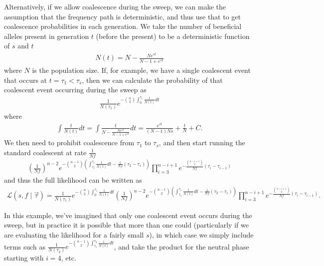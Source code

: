 \documentclass[reqno]{amsart}
\begin{document}
Alternatively, if we allow coalescence during the sweep, we can make the assumption that the frequency path is deterministic, and thus use that to get coalescence probabilities in each generation. We take the number of beneficial alleles present in generation $t$ (before the present) to be a deterministic function of $s$ and $t$
\begin{align}
	N(t) = N - \frac{N e^{st}}{N-1+e^{st}} 
\end{align}
where $N$ is the population size. If, for example, we have a single coalescent event that occurs at $t=\tau_1<\tau_s$, then we can calculate the probability of that coalescent event occurring during the sweep as 
\begin{align}
	\frac{1}{N(\tau_1)}e^{-\binom{n}{2}\int_0^{\tau_1}\frac{t}{N(t)}dt}
\end{align}
where
\begin{align}
	\int\frac{t}{N(t)}dt = \int\frac{t}{N - \frac{Ne^{st}}{N - 1 + e^{st}}}dt = \frac{e^{st}}{\left(N-1\right)Ns} + \frac{t}{N} + C.
\end{align}
We then need to prohibit coalescence from $\tau_1$ to $\tau_s$, and then start running the standard coalescent at rate $\frac{1}{Nf}$
\begin{align}
	\left(\frac{1}{Nf}\right)^{n-2}e^{-\binom{n-1}{2}\left(\int_{\tau_1}^{\tau_s}\frac{1}{N(t)}dt-\frac{1}{Nf}\left(\tau_2-\tau_{s}\right)\right)}\prod_{i=3}^{n-i+1}e^{-\frac{\binom{n-i+1}{2}}{Nf}\left(\tau_i-\tau_{i-1}\right)}
\end{align}
and thus the full likelihood can be written as
\begin{align}
	\mathcal{L}(s,f\mid \vec{\tau})=\frac{1}{N(\tau_1)}e^{-\binom{n}{2}\int_0^{\tau_1}\frac{1}{N(t)}dt}\left(\frac{1}{Nf}\right)^{n-2}e^{-\binom{n-1}{2}\left(\int_{\tau_1}^{\tau_s}\frac{1}{N(t)}dt-\frac{1}{Nf}\left(\tau_2-\tau_{s}\right)\right)}\prod_{i=3}^{n-i+1}e^{-\frac{\binom{n-i+1}{2}}{Nf}\left(\tau_i-\tau_{i-1}\right)}.
\end{align}

In this example, we've imagined that only one coalescent event occurs during the sweep, but in practice it is possible that more than one could (particularly if we are evaluating the likelihood for a fairly small $s$), in which case we simply include terms such as $\frac{1}{N(\tau_2)}e^{-\binom{n-1}{2}\int_{\tau_1}^{\tau_2}\frac{1}{N(t)}dt}$, and take the product for the neutral phase starting with $i=4$, etc.


\end{document}
